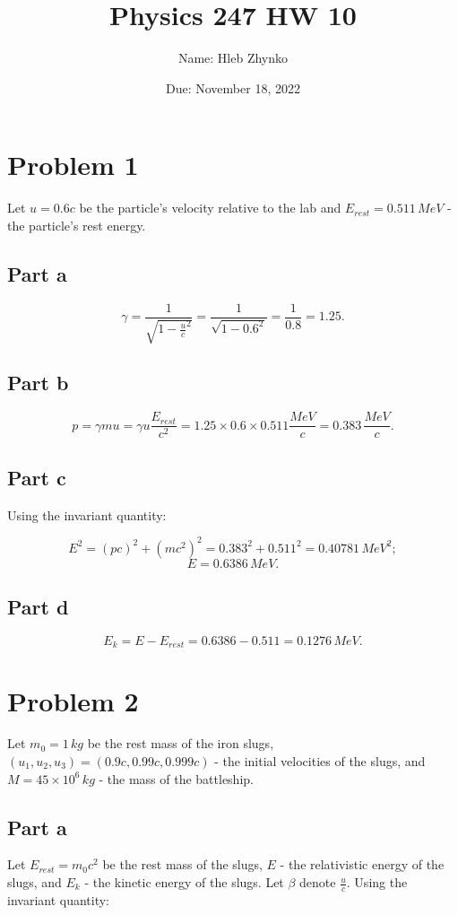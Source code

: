 \documentclass{article}
\title{Physics 247 HW 10}
\author{Name: Hleb Zhynko}
\date{Due: November 18, 2022}
\begin{document}
\maketitle

\section*{Problem 1}
Let $u = 0.6c$ be the particle's velocity relative to the lab and $E_{rest} = 0.511\,MeV$ - the particle's rest energy.

\subsection*{Part a}

\[
\gamma = \frac{1}{\sqrt{1 - \frac{u}{c}^2}} = \frac{1}{\sqrt{1 - 0.6^2}} = \frac{1}{0.8} = 1.25.
\]

\subsection*{Part b}

\[
p = \gamma mu = \gamma u \frac{E_{rest}}{c^2} = 1.25 \times 0.6 \times 0.511 \frac{MeV}{c} = 0.383\,\frac{MeV}{c}.
\]

\subsection*{Part c}
Using the invariant quantity:

\[
E^2 = (pc)^2 + (mc^2)^2 = 0.383^2 + 0.511^2 = 0.40781\,MeV^2;
\]
\[
E = 0.6386\,MeV.
\]

\subsection*{Part d}

\[
E_k = E - E_{rest} = 0.6386 - 0.511 = 0.1276\,MeV.
\]

\section*{Problem 2}
Let $m_0 = 1\,kg$ be the rest mass of the iron slugs, $(u_1, u_2, u_3) = (0.9c, 0.99c, 0.999c)$ - the initial velocities of the slugs, and $M = 45 \times 10^6\,kg$ - the mass of the battleship.

\subsection*{Part a}
Let $E_{rest} = m_0c^2$ be the rest mass of the slugs, $E$ - the relativistic energy of the slugs, and $E_k$ - the kinetic energy of the slugs. Let $\beta$ denote $\frac{u}{c}$. Using the invariant quantity:
\end{document}
